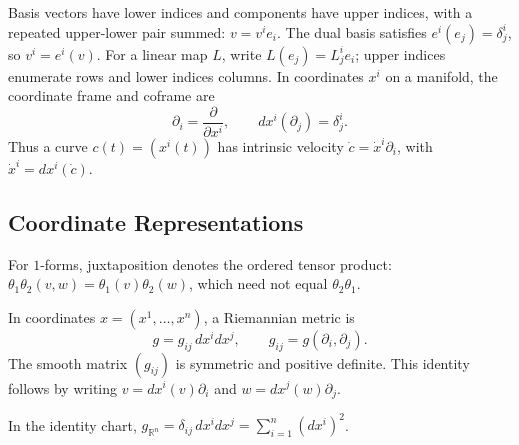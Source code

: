 \begin{convention}
  \label{conv:pet-ch1-einstein-summation}

  Basis vectors have lower indices and components have upper indices, with a
  repeated upper-lower pair summed:
  $v=v^ie_i$. The dual basis satisfies $e^i(e_j)=\delta^i_j$, so
  $v^i=e^i(v)$. For a linear map $L$, write
  $L(e_j)=L^i_j e_i$; upper indices enumerate rows and lower indices columns.
  In coordinates $x^i$ on a manifold, the coordinate frame and coframe are
  \[
    \partial_i=\frac{\partial}{\partial x^i},\qquad
    dx^i(\partial_j)=\delta^i_j.
  \]
  Thus a curve $c(t)=(x^i(t))$ has intrinsic velocity
  $\dot c=\dot x^i\partial_i$, with $\dot x^i=dx^i(\dot c)$.
\end{convention}

\subsection{Coordinate Representations}

For $1$-forms, juxtaposition denotes the ordered tensor product:
$\theta_1\theta_2(v,w)=\theta_1(v)\theta_2(w)$, which need not equal
$\theta_2\theta_1$.

\begin{definition}
  \label{def:pet-ch1-coordinate-metric}


  In coordinates $x=(x^1,\ldots,x^n)$, a Riemannian metric is
  \[
    g=g_{ij}\,dx^i dx^j,
    \qquad g_{ij}=g(\partial_i,\partial_j).
  \]
  The smooth matrix $(g_{ij})$ is symmetric and positive definite. This identity
  follows by writing $v=dx^i(v)\partial_i$ and
  $w=dx^j(w)\partial_j$.
\end{definition}

\begin{example}
  \label{ex:pet-ch1-euclidean-coords}


  In the identity chart,
  $g_{\mathbb{R}^n}=\delta_{ij}\,dx^i dx^j=\sum_{i=1}^n(dx^i)^2$.
\end{example}

